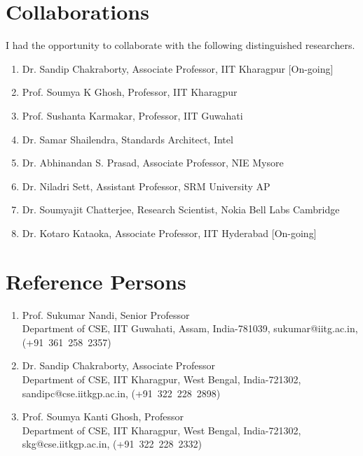 \documentclass{article}
\begin{document}
\section{Collaborations}
I had the opportunity to collaborate with the following distinguished researchers.
  \begin{enumerate}
  	\item Dr. Sandip Chakraborty, Associate Professor, IIT Kharagpur [On-going]
	\item Prof. Soumya K Ghosh, Professor, IIT Kharagpur
	\item Prof. Sushanta Karmakar, Professor, IIT Guwahati
	\item Dr. Samar Shailendra, Standards Architect, Intel
	\item Dr. Abhinandan S. Prasad, Associate Professor, NIE Mysore
	\item Dr. Niladri Sett, Assistant Professor, SRM University AP
	\item Dr. Soumyajit Chatterjee, Research Scientist, Nokia Bell Labs Cambridge
	\item Dr. Kotaro Kataoka, Associate Professor, IIT Hyderabad [On-going]
  \end{enumerate}
\section{Reference Persons}
  \begin{enumerate}
  \item Prof. Sukumar Nandi, Senior Professor\\Department of CSE, IIT Guwahati, Assam, India-781039, sukumar@iitg.ac.in, (+91~361~258~2357)
  \item Dr. Sandip Chakraborty, Associate Professor\\Department of CSE, IIT Kharagpur, West Bengal, India-721302, sandipc@cse.iitkgp.ac.in, (+91~322~228~2898)
  \item Prof. Soumya Kanti Ghosh, Professor\\Department of CSE, IIT Kharagpur, West Bengal, India-721302, skg@cse.iitkgp.ac.in, (+91~322~228~2332)
  \end{enumerate}
   \nocite{*}
  
  
\end{document}
